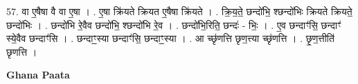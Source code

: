 \documentclass[17pt]{extarticle}
\begin{document}
57. वा ए॒षैषा वै वा ए॒षा । . ए॒षा क्रि॑यते क्रियत ए॒षैषा क्रि॑यते । . क्रि॒य॒ते॒ छन्दो॑भि॒ श्छन्दो॑भिः क्रियते क्रियते॒ छन्दो॑भिः । . छन्दो॑भि रे॒वैव छन्दो॑भि॒ श्छन्दो॑भि रे॒व । . छन्दो॑भि॒रिति॒ छन्दः॑ - भिः॒ । . ए॒व छन्दाꣳ॑सि॒ छन्दाꣳ॑ स्ये॒वैव छन्दाꣳ॑सि । . छन्दाꣳ॒॒स्या छन्दाꣳ॑सि॒ छन्दाꣳ॒॒स्या । . आ च्छृ॑णत्ति छृण॒त्त्या च्छृ॑णत्ति । . छृ॒ण॒त्तीति॑ छृणत्ति । \newline

\textbf{Ghana Paata } \newline
\end{document}
